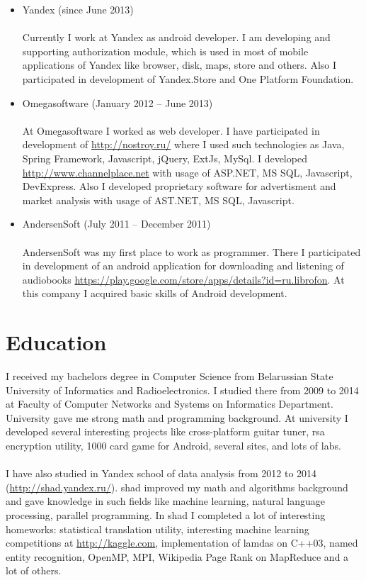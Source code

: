 \documentclass{article}
\begin{document}
\begin{itemize}

\item Yandex (since June 2013) \\\\
Currently I work at Yandex as android developer. I am developing and supporting authorization module, which is used in most of mobile applications of Yandex like browser, disk, maps, store and others. Also I participated in development of Yandex.Store and One Platform Foundation.

\item Omegasoftware (January 2012 – June 2013) \\\\
At Omegasoftware I worked as web developer. I have participated in development of \url{http://nostroy.ru/} where I used such technologies as Java, Spring Framework, Javascript, jQuery, ExtJs, MySql. I developed \url{http://www.channelplace.net} with usage of ASP.NET, MS SQL, Javascript, DevExpress. Also I developed proprietary software for advertisment and market analysis with usage of AST.NET, MS SQL, Javascript.

\item AndersenSoft (July 2011 – December 2011) \\\\
AndersenSoft was my first place to work as programmer. There I participated in development of an android application for downloading and listening of audiobooks \url{https://play.google.com/store/apps/details?id=ru.librofon}. At this company I acquired basic skills of Android development.
\end{itemize}

\section*{Education}
I received my bachelors degree in Computer Science from Belarussian State University of Informatics and Radioelectronics. I studied there from 2009 to 2014 at Faculty of Computer Networks and Systems on Informatics Department. University gave me strong math and programming background. At university I developed several interesting projects like cross-platform guitar tuner, rsa encryption utility, 1000 card game for Android, several sites, and lots of labs.\\\\
I have also studied in Yandex school of data analysis from 2012 to 2014 (\url{http://shad.yandex.ru/}). shad improved my math and algorithms background and gave knowledge in such fields like machine learning, natural language processing, parallel programming. In shad I completed a lot of interesting homeworks: statistical translation utility, interesting machine learning competitions at \url{http://kaggle.com}, implementation of lamdas on C++03, named entity recognition, OpenMP, MPI, Wikipedia Page Rank on MapReduce and a lot of others.
\end{document}
